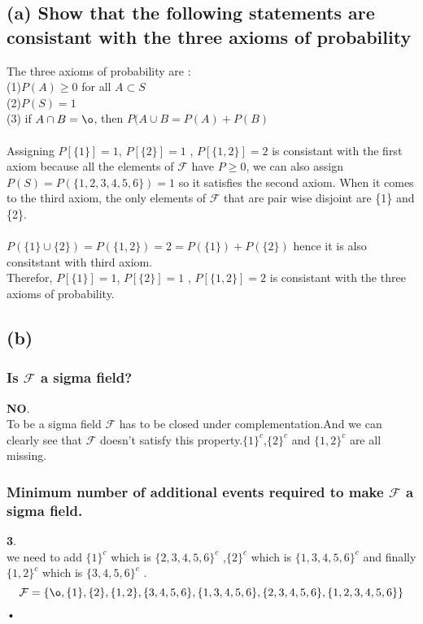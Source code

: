 \documentclass[a4paper,11pt]{article}
\begin{document}
\subsection*{(a) Show that the following statements are consistant with the three axioms of probability}
The three axioms of probability are :\\
(1)$P(A) \ge 0$ for all $A \subset S$ \\
(2)$P(S) = 1$\\
(3) if $A \cap B = \o$, then $P(A \cup B = P(A)+P(B)$  \\\\
Assigning $P[\{1\}]=1$, $P[\{2\}]=1$ , $P[\{1,2\}]=2$ is consistant with the first axiom because all the elements of $\mathcal{F}$ have $P \ge 0$, we can also assign $P(S) = P(\{1,2,3,4,5,6\}) = 1$ so it satisfies the second axiom.
When it comes to the third axiom, the only elements of $\mathcal{F}$ that are pair wise disjoint are \{1\} and \{2\}.\\\\
 $P(\{1\}\cup \{2\})=P(\{1,2\}) = 2 = P(\{1\}) + P(\{2\})$ hence it is also consitstant with third axiom.\\
 Therefor, $P[\{1\}]=1$, $P[\{2\}]=1$ , $P[\{1,2\}]=2$ is consistant with the three axioms of probability.

\subsection*{(b)}

\subsubsection*{Is $\mathcal{F}$ a sigma field?}
\textbf{NO}.\\
To be a sigma field $\mathcal{F}$ has to be closed under complementation.And we can clearly see that $\mathcal{F}$ doesn't satisfy this property.$\{1\}^c$,$\{2\}^c$ and $\{1,2\}^c$ are all missing. \\
\subsubsection*{Minimum number of additional events required to make  $\mathcal{F}$ a sigma field.}
\textbf{3}.\\
we need to add $\{1\}^c$ which is $\{2,3,4,5,6\}^c$ ,$\{2\}^c$ which is $\{1,3,4,5,6\}^c$ and finally $\{1,2\}^c$ which is $\{3,4,5,6\}^c$ .\\
\begin{equation}\label{eq:new_f}
\mathcal{F} = \{ \o , \{1\},\{2\},\{1,2\},\{3,4,5,6\},\{1,3,4,5,6\},\{2,3,4,5,6\},\{1,2,3,4,5,6\}\}
\end{equation}•
\end{document}
